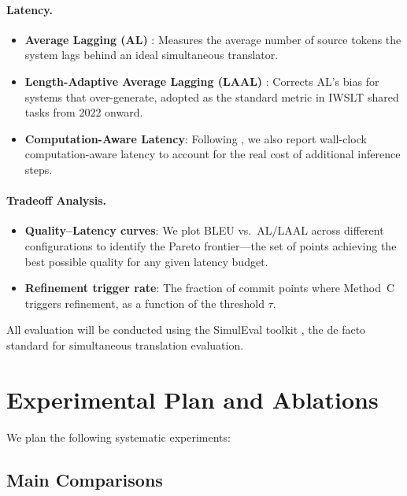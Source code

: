 \paragraph{Latency.}
\begin{itemize}[leftmargin=*, itemsep=2pt]
    \item \textbf{Average Lagging (AL)} \citep{ma2019stacl}: Measures the average number of source tokens the system lags behind an ideal simultaneous translator.
    \item \textbf{Length-Adaptive Average Lagging (LAAL)} \citep{papi2022laal}: Corrects AL's bias for systems that over-generate, adopted as the standard metric in IWSLT shared tasks from 2022 onward.
    \item \textbf{Computation-Aware Latency}: Following \citet{ma2020simulst}, we also report wall-clock computation-aware latency to account for the real cost of additional inference steps.
\end{itemize}

\paragraph{Tradeoff Analysis.}
\begin{itemize}[leftmargin=*, itemsep=2pt]
    \item \textbf{Quality--Latency curves}: We plot BLEU vs.\ AL/LAAL across different configurations to identify the Pareto frontier---the set of points achieving the best possible quality for any given latency budget.
    \item \textbf{Refinement trigger rate}: The fraction of commit points where Method~C triggers refinement, as a function of the threshold $\tau$.
\end{itemize}

All evaluation will be conducted using the SimulEval toolkit \citep{ma2020simuleval}, the de facto standard for simultaneous translation evaluation.


\section{Experimental Plan and Ablations}

We plan the following systematic experiments:

\subsection{Main Comparisons}

